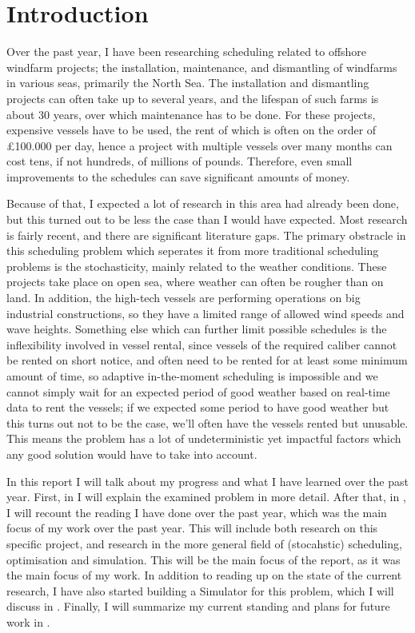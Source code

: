 \documentclass[a4paper,12pt]{article}
\begin{document}
\title{}
\author{R. Kuipers}
\date{April, 2019}

\section{Introduction} \label{s:intro}
Over the past year, I have been researching scheduling related to offshore windfarm projects; the installation, maintenance, and dismantling of windfarms in various seas, primarily the North Sea. The installation and dismantling projects can often take up to several years, and the lifespan of such farms is about 30 years, over which maintenance has to be done. For these projects, expensive vessels have to be used, the rent of which is often on the order of \pounds 100.000 per day, hence a project with multiple vessels over many months can cost tens, if not hundreds, of millions of pounds.  Therefore, even small improvements to the schedules can save significant amounts of money. %

Because of that, I expected a lot of research in this area had already been done, but this turned out to be less the case than I would have expected. Most research is fairly recent, and there are significant literature gaps. The primary obstracle in this scheduling problem which seperates it from more traditional scheduling problems is the stochasticity, mainly related to the weather conditions. These projects take place on open sea, where weather can often be rougher than on land. In addition, the high-tech vessels are performing operations on big industrial constructions, so they have a limited range of allowed wind speeds and wave heights. Something else which can further limit possible schedules is the inflexibility involved in vessel rental, since vessels of the required caliber cannot be rented on short notice, and often need to be rented for at least some minimum amount of time, so adaptive in-the-moment scheduling is impossible and we cannot simply wait for an expected period of good weather based on real-time data to rent the vessels; if we expected some period to have good weather but this turns out not to be the case, we'll often have the vessels rented but unusable. This means the problem has a lot of undeterministic yet impactful factors which any good solution would have to take into account. 

In this report I will talk about my progress and what I have learned over the past year. First, in  I will explain the examined problem in more detail. After that, in , I will recount the reading I have done over the past year, which was the main focus of my work over the past year. This will include both research on this specific project, and research in the more general field of (stocahstic) scheduling, optimisation and simulation. This will be the main focus of the report, as it was the main focus of my work. In addition to reading up on the state of the current research, I have also started building a Simulator for this problem, which I will discuss in . Finally, I will summarize my current standing and plans for future work in . 
\end{document}
